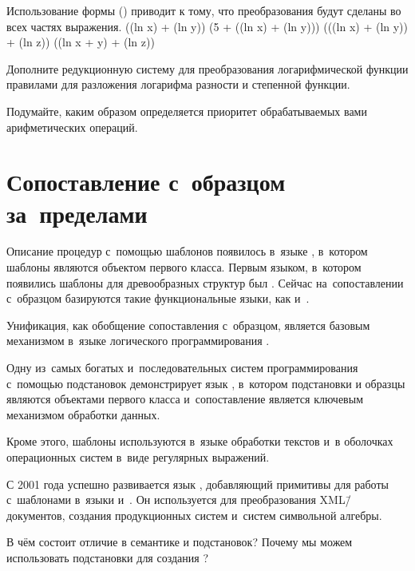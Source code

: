 Использование формы  () приводит к тому, что преобразования будут сделаны во всех частях выражения.
     {((ln x) + (ln y))}
     {(5 + ((ln x) + (ln y)))}
     {(((ln x) + (ln y)) + (ln z))}
     {((ln x + y) + (ln z))}

\begin{Assignment}
Дополните редукционную систему для преобразования логарифмической функции правилами для разложения логарифма разности и степенной функции.

Подумайте, каким образом определяется приоритет обрабатываемых вами арифметических операций.
\end{Assignment}

\section[4]{Сопоставление с~образцом \mbox{за~пределами~\Scheme}}%
Описание процедур с~помощью шаблонов появилось в~языке , в~котором шаблоны являются объектом первого класса. Первым языком, в~котором появились шаблоны для древообразных структур был \Lisp. Сейчас на~сопоставлении с~образцом базируются такие функциональные языки, как  и~.

Унификация, как обобщение сопоставления с~образцом, является базовым механизмом в~языке логического программирования .

Одну из~самых богатых и~последовательных систем программирования с~помощью подстановок демонстрирует язык , в~котором подстановки и образцы являются объектами первого класса и~сопоставление является ключевым механизмом обработки данных.

Кроме этого, шаблоны используются в~языке обработки текстов  и~в оболочках операционных систем в~виде регулярных выражений.

С 2001 года успешно развивается язык , добавляющий примитивы для работы с~шаблонами в~языки  и~. Он используется для преобразования XML\=/документов, создания продукционных систем и~систем символьной алгебры.

\begin{Queeze}
 \item В чём состоит отличие в семантике  и подстановок? Почему мы можем использовать подстановки для создания ?
\end{Queeze}
